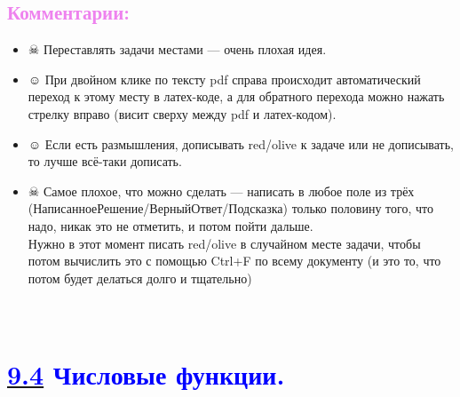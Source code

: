 \documentclass[12pt]{article}
\newcounter{num}
\newenvironment{mylist} %
{ \begin{itemize}
    \setlength{\itemsep}{0pt}
    \setlength{\parskip}{0pt}
    \setlength{\parsep}{0pt}     }
{ \end{itemize}                  }
\begin{document}
\subsection*{\textcolor{Violet}{\textbf{Комментарии:}}}%
\begin{mylist}
\item [$\skull$] Переставлять задачи местами --- очень плохая идея.

\item [$\smiley$] При двойном клике по тексту pdf справа происходит автоматический переход к этому месту в латех-коде, а для обратного перехода можно нажать стрелку вправо (висит сверху между pdf и латех-кодом).

\item [$\smiley$] Если есть размышления, дописывать red/olive к задаче или не дописывать, то лучше всё-таки дописать.

\item [$\skull$] Самое плохое, что можно сделать --- написать в любое поле из трёх (НаписанноеРешение/ВерныйОтвет/Подсказка) только половину того, что надо, никак это не отметить, и потом пойти дальше.\\ Нужно в этот момент писать red/olive в случайном месте задачи, чтобы потом вычислить это с помощью Ctrl+F по всему документу (и это то, что потом будет делаться долго и тщательно)
\end{mylist}

\newpage
\setcounter{num}{1372}

\hypertarget{9.4}{{\centering\section*{\bigskip\\\textcolor{Blue}{\hyperlink{start2}{\textcolor{Blue}{9.4}} Числовые функции.}\vspace{-5mm}}}}
\end{document}
